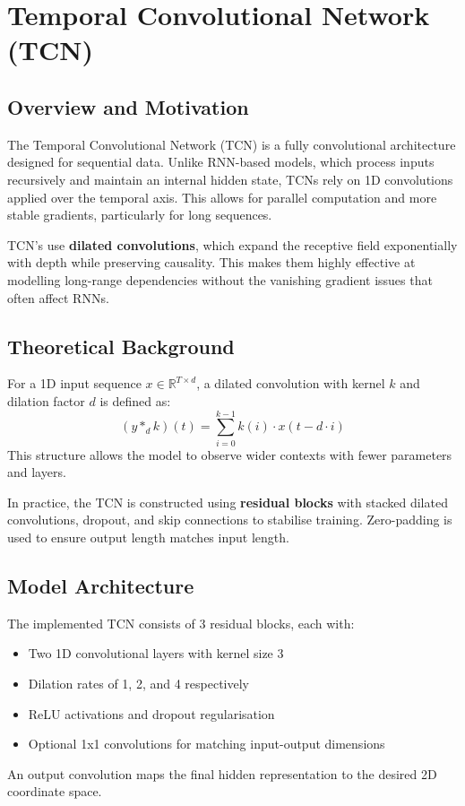 \section{Temporal Convolutional Network (TCN)}

\subsection{Overview and Motivation}
The Temporal Convolutional Network (TCN) is a fully convolutional architecture designed for sequential data. Unlike RNN-based models, which process inputs recursively and maintain an internal hidden state, TCNs rely on 1D convolutions applied over the temporal axis. This allows for parallel computation and more stable gradients, particularly for long sequences.

TCN's use \textbf{dilated convolutions}, which expand the receptive field exponentially with depth while preserving causality. This makes them highly effective at modelling long-range dependencies without the vanishing gradient issues that often affect RNNs.

\subsection{Theoretical Background}
For a 1D input sequence $x \in \mathbb{R}^{T \times d}$, a dilated convolution with kernel $k$ and dilation factor $d$ is defined as:
\[
(y *_{d} k)(t) = \sum_{i=0}^{k-1} k(i) \cdot x(t - d \cdot i)
\]
This structure allows the model to observe wider contexts with fewer parameters and layers.

In practice, the TCN is constructed using \textbf{residual blocks} with stacked dilated convolutions, dropout, and skip connections to stabilise training. Zero-padding is used to ensure output length matches input length.

\subsection{Model Architecture}
The implemented TCN consists of 3 residual blocks, each with:
\begin{itemize}
    \item Two 1D convolutional layers with kernel size 3
    \item Dilation rates of 1, 2, and 4 respectively
    \item ReLU activations and dropout regularisation
    \item Optional 1x1 convolutions for matching input-output dimensions
\end{itemize}
An output convolution maps the final hidden representation to the desired 2D coordinate space.

